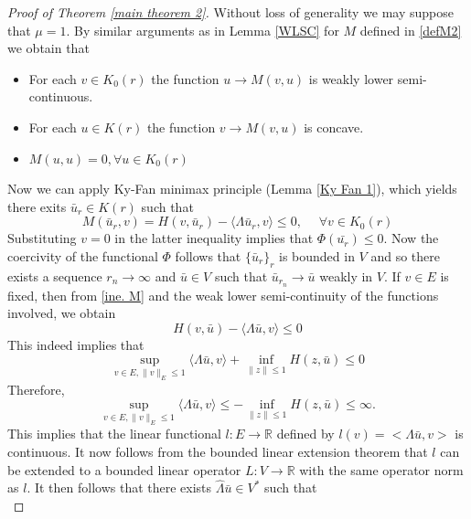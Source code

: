 \documentclass[reqno]{amsart}
\begin{document}
\begin{proof}[Proof of Theorem \ref{main theorem 2}]
Without loss of generality we may suppose that \(\mu=1\). By  similar arguments as
in Lemma \ref{WLSC} for \(M\) defined in \eqref{defM2} we obtain that
\begin{itemize}
   \item   For each \(v \in K_0(r)\) the function \(u \to M(v, u)\) is weakly lower semi-continuous.
   \item  For each \(u \in K(r)\) the function \(v \to M(v, u)\) is concave.
   \item \(M(u,u)=0, \forall u\in K_0(r)\)
\end{itemize}
Now we can apply  Ky-Fan minimax
principle (Lemma \ref{Ky Fan 1}), which yields there exits \( \bar{u}_r\in K(r)\)
such that
\begin{equation}\label{ine. M}
  M(\bar{u}_r,v)=H(v, \bar{u}_r) -\langle\Lambda \bar{u}_r,v \rangle
  \leq 0,\quad \;\forall v\in K_0(r)
\end{equation}
Substituting \(v =0\)  in the latter inequality  implies that \(\Phi(\bar{u_r})\leq0\).
Now the coercivity of the functional \(\Phi\)  follows that
\(\{\bar{u}_r\}_r\) is bounded in \(V\) and so  there
exists a sequence \(r_n \to\infty\) and \(\bar{u}\in V\)  such that
\(\bar{u}_{r_n}\to\bar{u}\) weakly in \(V\). If \(v\in E\) is fixed, then
from \eqref{ine. M} and the weak lower semi-continuity of the functions involved, we obtain
\begin{equation}\label{ine. H}
  H(v, \bar{u}) -\langle\Lambda \bar{u},v \rangle\leq 0
\end{equation}
This indeed implies that
\begin{equation}\label{ine. sup 2}
  \sup_{v\in E,\rVert v\rVert_{E}\leq 1}
  \langle \Lambda \bar{u},v\rangle +\inf_{\rVert z \rVert\leq 1} H(z,\bar{u}) \leq 0
\end{equation}
Therefore,
\begin{equation}
  \sup_{v\in E,\rVert v\rVert_{E}\leq 1}   \langle \Lambda \bar{u},v\rangle
  \leq -\inf_{\rVert z \rVert\leq 1} H(z,\bar{u}) \leq \infty.
\end{equation}
This implies that the linear functional \(l : E \to\mathbb{R}\) defined by
\(l(v) = <\Lambda \bar{u}, v>\) is continuous. It now follows from the bounded
linear extension theorem that \(l\) can be extended to a bounded linear operator
\(L : V \to\mathbb{R}\) with the same
operator norm as \(l\). It then follows that there exists
\(\hat{\Lambda}\bar{u}\in V^*\) such that
\begin{equation}\label{hat}

\end{equation}
\end{proof}
\end{document}
